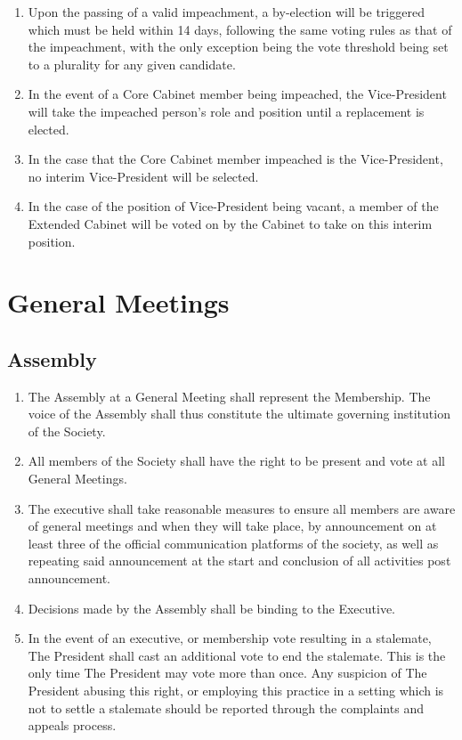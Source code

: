 \documentclass[parskip=half]{scrartcl}
\begin{document}
\begin{enumerate}
                \item Upon the passing of a valid impeachment, a by-election will be triggered which must be held within 14 days, following the same voting rules as that of the impeachment, with the only exception being the vote threshold being set to a plurality for any given candidate.

                \item In the event of a Core Cabinet member being impeached, the Vice-President will take the impeached person’s role and position until a replacement is elected.
                
                \item In the case that the Core Cabinet member impeached is the Vice-President, no interim Vice-President will be selected.
                
                \item In the case of the position of Vice-President being vacant, a member of the Extended Cabinet will be voted on by the Cabinet to take on this interim position.
            \end{enumerate}
            
    \clearpage
    \section{General Meetings}
        \label{gm}
        \subsection{Assembly}
            \label{gm--assembly}
            \begin{enumerate}
                \item The Assembly at a General Meeting shall represent the Membership.
                    \subitem The voice of the Assembly shall thus constitute the ultimate governing institution of the Society.
                    
                \item All members of the Society shall have the right to be present and vote at all General Meetings.
                \item The executive shall take reasonable measures to ensure all members are aware of general meetings and when they will take place, by announcement on at least three of the official communication platforms of the society, as well as repeating said announcement  at the start and conclusion of all activities post announcement.
                \item Decisions made by the Assembly shall be binding to the Executive.
                \item In the event of an executive, or membership vote resulting in a stalemate, The President shall cast an additional vote to end the stalemate. This is the only time The President may vote more than once. Any suspicion of The President abusing this right, or employing this practice in a setting which is not to settle a stalemate should be reported through the complaints and appeals process.
            \end{enumerate}
        
\end{document}
